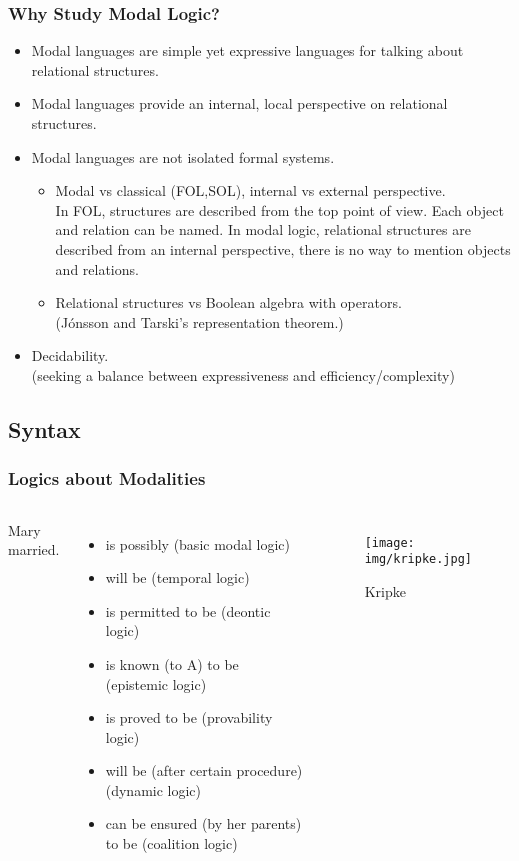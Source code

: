 \documentclass[UTF8,11pt,colorlinks,compress,openany]{beamer}%
\begin{document}
\begin{frame}\frametitle{Why Study Modal Logic?}
	\begin{itemize}
		\item Modal languages are simple yet expressive languages for talking about relational structures.
		\item Modal languages provide an internal, local perspective on relational structures.
		\item Modal languages are not isolated formal systems.
		\begin{itemize}
			\item Modal vs classical (FOL,SOL), internal vs external perspective.\\
			In FOL, structures are described from the top point of view. Each object and relation can be named. In modal logic, relational structures are described from an internal perspective, there is no way to mention objects and relations.
			\item Relational structures vs Boolean algebra with operators.\\
			(J\'onsson and Tarski's representation theorem.)
		\end{itemize}
		\item Decidability.\\
		(seeking a balance between expressiveness and efficiency/complexity)
	\end{itemize}
\end{frame}

\subsection{Syntax}

\begin{frame}\frametitle{Logics about Modalities}
\begin{columns}
Mary \underline{\phantom{xxxxx}} married.
\begin{itemize}
	\item is possibly (basic modal logic)
	\item will be (temporal logic)
	\item is permitted to be (deontic logic)
	\item is known (to A) to be (epistemic logic)
	\item is proved to be (provability logic)
	\item will be (after certain procedure) (dynamic logic)
	\item can be ensured (by her parents) to be (coalition logic)
\end{itemize}
\begin{figure}[H]
\texttt{[image: img/kripke.jpg]}\caption{Kripke}
\end{figure}
\end{columns}
\end{frame}
\end{document}
